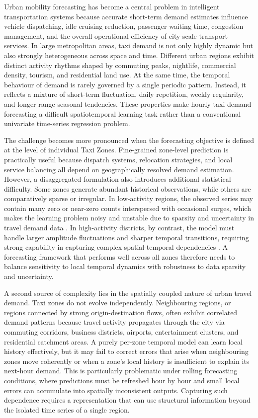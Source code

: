 \documentclass[12pt,a4paper]{report}
\begin{document}
Urban mobility forecasting has become a central problem in intelligent transportation systems because accurate short-term demand estimates influence vehicle dispatching, idle cruising reduction, passenger waiting time, congestion management, and the overall operational efficiency of city-scale transport services.\cite{xue_2020_spatialtemporal} In large metropolitan areas, taxi demand is not only highly dynamic but also strongly heterogeneous across space and time.\cite{qian_2015_spatial} Different urban regions exhibit distinct activity rhythms shaped by commuting peaks, nightlife, commercial density, tourism, and residential land use. At the same time, the temporal behaviour of demand is rarely governed by a single periodic pattern. Instead, it reflects a mixture of short-term fluctuation, daily repetition, weekly regularity, and longer-range seasonal tendencies. These properties make hourly taxi demand forecasting a difficult spatiotemporal learning task rather than a conventional univariate time-series regression problem.\cite{schaller_2005_a}

The challenge becomes more pronounced when the forecasting objective is defined at the level of individual Taxi Zones. Fine-grained zone-level prediction is practically useful because dispatch systems, relocation strategies, and local service balancing all depend on geographically resolved demand estimation.\cite{8691703} However, a disaggregated formulation also introduces additional statistical difficulty. Some zones generate abundant historical observations, while others are comparatively sparse or irregular. In low-activity regions, the observed series may contain many zero or near-zero counts interspersed with occasional surges, which makes the learning problem noisy and unstable due to sparsity and uncertainty in travel demand data \cite{zhuang2022sparse}. In high-activity districts, by contrast, the model must handle larger amplitude fluctuations and sharper temporal transitions, requiring strong capability in capturing complex spatial-temporal dependencies \cite{wu2019graph}. A forecasting framework that performs well across all zones therefore needs to balance sensitivity to local temporal dynamics with robustness to data sparsity and uncertainty.

A second source of complexity lies in the spatially coupled nature of urban travel demand. Taxi zones do not evolve independently. Neighbouring regions, or regions connected by strong origin-destination flows, often exhibit correlated demand patterns because travel activity propagates through the city via commuting corridors, business districts, airports, entertainment clusters, and residential catchment areas.\cite{xue_2020_spatialtemporal} A purely per-zone temporal model can learn local history effectively, but it may fail to correct errors that arise when neighbouring zones move coherently or when a zone's local history is insufficient to explain its next-hour demand. This is particularly problematic under rolling forecasting conditions, where predictions must be refreshed hour by hour and small local errors can accumulate into spatially inconsistent outputs. Capturing such dependence requires a representation that can use structural information beyond the isolated time series of a single region.
\end{document}
